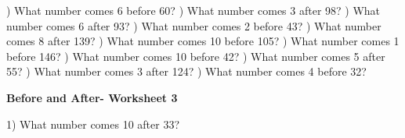 \documentclass{article}%
\begin{document}
\newline%
\newline%
) What number comes 6 before 60?%
\newline%
\newline%
) What number comes 3 after 98?%
\newline%
\newline%
) What number comes 6 after 93?%
\newline%
\newline%
) What number comes 2 before 43?%
\newline%
\newline%
) What number comes 8 after 139?%
\newline%
\newline%
) What number comes 10 before 105?%
\newline%
\newline%
) What number comes 1 before 146?%
\newline%
\newline%
) What number comes 10 before 42?%
\newline%
\newline%
) What number comes 5 after 55?%
\newline%
\newline%
) What number comes 3 after 124?%
\newline%
\newline%
) What number comes 4 before 32?%
\newline%
\newline%
\newline%
\pagebreak%
\large%
\begin{center}%
\textbf{Before and After- Worksheet 3}%
\newline%
\end{center} \normalsize%
1) What number comes 10 after 33?%
\newline%
\newline%
\newline%
\end{document}
